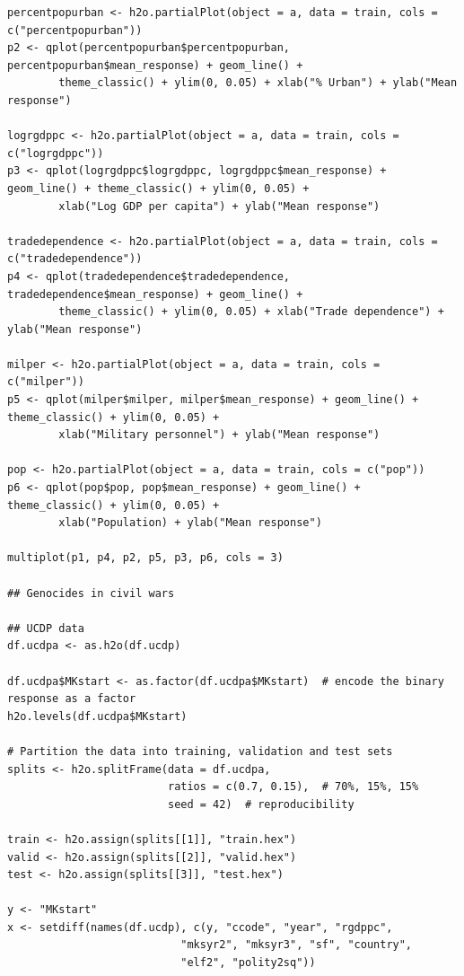 \begin{verbatim}
percentpopurban <- h2o.partialPlot(object = a, data = train, cols = c("percentpopurban"))
p2 <- qplot(percentpopurban$percentpopurban, percentpopurban$mean_response) + geom_line() +
        theme_classic() + ylim(0, 0.05) + xlab("% Urban") + ylab("Mean response")

logrgdppc <- h2o.partialPlot(object = a, data = train, cols = c("logrgdppc"))
p3 <- qplot(logrgdppc$logrgdppc, logrgdppc$mean_response) + geom_line() + theme_classic() + ylim(0, 0.05) +
        xlab("Log GDP per capita") + ylab("Mean response")

tradedependence <- h2o.partialPlot(object = a, data = train, cols = c("tradedependence"))
p4 <- qplot(tradedependence$tradedependence, tradedependence$mean_response) + geom_line() +
        theme_classic() + ylim(0, 0.05) + xlab("Trade dependence") + ylab("Mean response")

milper <- h2o.partialPlot(object = a, data = train, cols = c("milper"))
p5 <- qplot(milper$milper, milper$mean_response) + geom_line() + theme_classic() + ylim(0, 0.05) +
        xlab("Military personnel") + ylab("Mean response")

pop <- h2o.partialPlot(object = a, data = train, cols = c("pop"))
p6 <- qplot(pop$pop, pop$mean_response) + geom_line() + theme_classic() + ylim(0, 0.05) +
        xlab("Population) + ylab("Mean response")

multiplot(p1, p4, p2, p5, p3, p6, cols = 3)

## Genocides in civil wars

## UCDP data
df.ucdpa <- as.h2o(df.ucdp)

df.ucdpa$MKstart <- as.factor(df.ucdpa$MKstart)  # encode the binary response as a factor
h2o.levels(df.ucdpa$MKstart)

# Partition the data into training, validation and test sets
splits <- h2o.splitFrame(data = df.ucdpa, 
                         ratios = c(0.7, 0.15),  # 70%, 15%, 15%
                         seed = 42)  # reproducibility

train <- h2o.assign(splits[[1]], "train.hex")   
valid <- h2o.assign(splits[[2]], "valid.hex") 
test <- h2o.assign(splits[[3]], "test.hex")

y <- "MKstart"
x <- setdiff(names(df.ucdp), c(y, "ccode", "year", "rgdppc",
                           "mksyr2", "mksyr3", "sf", "country",
                           "elf2", "polity2sq")) 


\end{verbatim}
